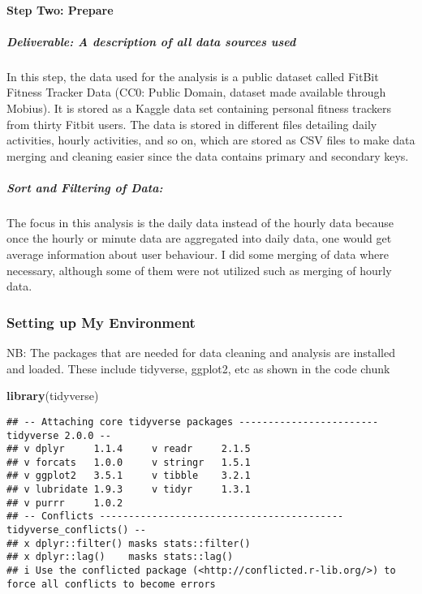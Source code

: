 \documentclass[
]{article}
\newenvironment{Shaded}{\begin{snugshade}}{\end{snugshade}}
\newcommand{\FunctionTok}[1]{\textcolor[rgb]{0.13,0.29,0.53}{\textbf{#1}}}
\newcommand{\NormalTok}[1]{#1}
\begin{document}
\paragraph{Step Two: Prepare}\label{step-two-prepare}

\subparagraph{Deliverable: A description of all data sources
used}\label{deliverable-a-description-of-all-data-sources-used}

In this step, the data used for the analysis is a public dataset called
FitBit Fitness Tracker Data (CC0: Public Domain, dataset made available
through Mobius). It is stored as a Kaggle data set containing personal
fitness trackers from thirty Fitbit users. The data is stored in
different files detailing daily activities, hourly activities, and so
on, which are stored as CSV files to make data merging and cleaning
easier since the data contains primary and secondary keys.

\subparagraph{Sort and Filtering of
Data:}\label{sort-and-filtering-of-data}

The focus in this analysis is the daily data instead of the hourly data
because once the hourly or minute data are aggregated into daily data,
one would get average information about user behaviour. I did some
merging of data where necessary, although some of them were not utilized
such as merging of hourly data.

\subsubsection{Setting up My
Environment}\label{setting-up-my-environment}

NB: The packages that are needed for data cleaning and analysis are
installed and loaded. These include tidyverse, ggplot2, etc as shown in
the code chunk

\begin{Shaded}
\begin{Highlighting}[]
\FunctionTok{library}\NormalTok{(tidyverse)}
\end{Highlighting}
\end{Shaded}

\begin{verbatim}
## -- Attaching core tidyverse packages ------------------------ tidyverse 2.0.0 --
## v dplyr     1.1.4     v readr     2.1.5
## v forcats   1.0.0     v stringr   1.5.1
## v ggplot2   3.5.1     v tibble    3.2.1
## v lubridate 1.9.3     v tidyr     1.3.1
## v purrr     1.0.2     
## -- Conflicts ------------------------------------------ tidyverse_conflicts() --
## x dplyr::filter() masks stats::filter()
## x dplyr::lag()    masks stats::lag()
## i Use the conflicted package (<http://conflicted.r-lib.org/>) to force all conflicts to become errors
\end{verbatim}
\end{document}
